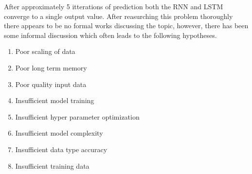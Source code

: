 \documentclass{article}
\begin{document}
After approximately 5 itterations of prediction both the RNN and LSTM converge to a single output value. After reasurching this problem thoroughly there appears to be no formal works discussing the topic, however, there has been some informal discussion which often leads to the following hypotheses.
\begin{enumerate}
\item Poor scaling of data
\item Poor long term memory
\item Poor quality input data
\item Insufficient model training
\item Insufficient hyper parameter optimization
\item Insufficient model complexity
\item Insufficient data type accuracy
\item Insufficient training data
\end{enumerate}
\end{document}
